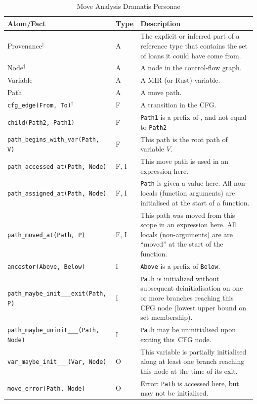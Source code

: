 \documentclass[11pt,a4paper,twoside,openany,draft]{report}
\newcommand{\notmine}[0] {$^\dagger$}
\newcommand{\InDatalog}[1]{\texttt{#1}}
\begin{document}
{ \renewcommand{\arraystretch}{1.0}
\begin{table}[!htbp]
  \begin{tabular}{@{}l l m{5.5cm}}
    Atom/Fact & Type & Description \\ \toprule
    Provenance\notmine{} & A & The explicit or inferred part of a reference type that contains the set of loans it could have come from.  \\
    Node\notmine{} & A & A node in the control-flow graph. \\
    Variable & A & A MIR (or Rust) variable. \\
    Path & A & A move path. \\
    \InDatalog{cfg_edge(From, To)}\notmine{} & F & A transition in the CFG\@. \\
    \InDatalog{child(Path2, Path1)} & F & \InDatalog{Path1} is a prefix of-, and not equal to \InDatalog{Path2}  \\
    \InDatalog{path_begins_with_var(Path, V)} & F & This path is the root path of variable $V$. \\
    \InDatalog{path_accessed_at(Path, Node)} & F, I & This move path is used in an expression here.\\
    \InDatalog{path_assigned_at(Path, Node)} & F, I & \InDatalog{Path} is given a value here. All non-locals (function arguments) are initialised at the start of a function.\\
    \InDatalog{path_moved_at(Path, P)} & F, I & This path was moved from this scope in an expression here. All locals (non-arguments) are are ``moved'' at the start of the function. \\
    \InDatalog{ancestor(Above, Below)} & I & \InDatalog{Above} is a prefix of \InDatalog{Below}.\\
    \InDatalog{path_maybe_init___exit(Path, P)} & I & \InDatalog{Path} is initialized without subsequent deinitialisation on one or more branches reaching this CFG node (lowest upper bound on set membership).\\
    \InDatalog{path_maybe_uninit___(Path, Node)} & I & \InDatalog{Path} may be uninitialised upon exiting this~CFG node. \\
    \InDatalog{var_maybe_init___(Var, Node)} & O & This variable is partially initialised along at least one branch reaching this node at the time of its exit. \\
    \InDatalog{move_error(Path, Node)} & O & Error: \InDatalog{Path} is accessed here, but may not be initialised. \\
  \end{tabular}
\caption{Move Analysis Dramatis Personae}\label{tab:move-facts-recap}
\end{table}%
}
\end{document}
